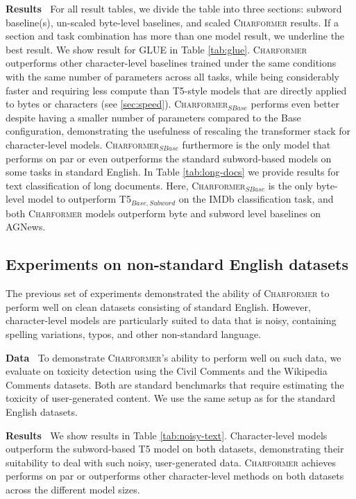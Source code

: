 \documentclass{article} \usepackage{iclr2022_conference,times}
\newcommand{\charformer}{\textsc{Charformer}\xspace}
\newcommand{\charformertall}{\textsc{Charformer}$_{SBase}$\xspace}
\begin{document}
\noindent \textbf{Results} $\:$  For all result tables, we divide the table into three sections: subword baseline(s), un-scaled byte-level baselines, and scaled \charformer results. If a section and task combination has more than one model result, we underline the best result. We show result for GLUE in Table \ref{tab:glue}. \charformer outperforms other character-level baselines trained under the same conditions with the same number of parameters across all tasks, while being considerably faster and requiring less compute than T5-style models that are directly applied to bytes or characters (see \textsection \ref{sec:speed}). \charformertall performs even better despite having a smaller number of parameters compared to the Base configuration, demonstrating the usefulness of rescaling the transformer stack for character-level models. \charformertall furthermore is the only model that performs on par or even outperforms the standard subword-based models on some tasks in standard English. In Table \ref{tab:long-docs} we provide results for text classification of long documents. Here, \charformertall is the only byte-level model to outperform T5$_{Base,Subword}$ on the IMDb classification task, and both \charformer models outperform byte and subword level baselines on AGNews.

\subsection{Experiments on non-standard English datasets}

The previous set of experiments demonstrated the ability of \charformer to perform well on clean datasets consisting of standard English. However, character-level models are particularly suited to data that is noisy, containing spelling variations, typos, and other non-standard language. 

\noindent \textbf{Data} $\:$ To demonstrate \charformer's ability to perform well on such data, we evaluate on toxicity detection using the Civil Comments \citep{DBLP:journals/corr/abs-1903-04561} and the Wikipedia Comments \citep{10.1145/3038912.3052591} datasets. Both are standard benchmarks that require estimating the toxicity of user-generated content. We use the same setup as for the standard English datasets.

\noindent \textbf{Results} $\:$ We show results in Table \ref{tab:noisy-text}. Character-level models outperform the subword-based T5 model on both datasets, demonstrating their suitability to deal with such noisy, user-generated data. \charformer achieves performs on par or outperforms other character-level methods on both datasets across the different model sizes.
\end{document}

